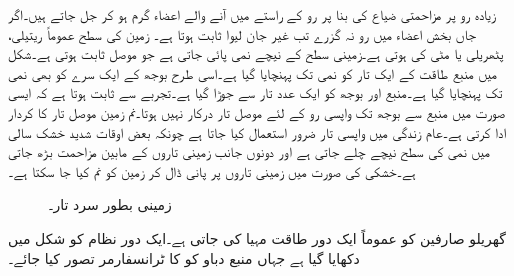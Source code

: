 زیادہ رو  پر مزاحمتی ضیاع کی بنا پر رو کے راستے میں آنے والے اعضاء گرم ہو کر جل جاتے ہیں۔اگر جاں بخش اعضاء میں رو نہ گزرے تب غیر جان لیوا ثابت ہوتا ہے۔  
زمین کی سطح عموماً ریتیلی، پٹھریلی یا مٹی کی ہوتی ہے۔زمینی سطح کے نیچے نمی پائی جاتی ہے جو موصل ثابت ہوتی ہے۔شکل  میں منبع طاقت کے ایک تار کو نمی تک پہنچایا گیا ہے۔اسی طرح بوجھ کے ایک سرے کو بھی نمی تک پہنچایا گیا ہے۔منبع اور بوجھ کو ایک عدد تار سے جوڑا گیا ہے۔تجربے سے ثابت ہوتا ہے کہ ایسی صورت میں منبع سے بوجھ تک واپسی رو کے لئے موصل تار درکار نہیں ہوتا۔نم زمین موصل تار کا کردار ادا کرتی ہے۔عام زندگی میں واپسی تار ضرور استعمال کیا جاتا ہے چونکہ بعض اوقات شدید خشک سالی میں نمی کی سطح نیچے چلے جاتی ہے اور دونوں جانب زمینی تاروں کے مابین مزاحمت بڑھ جاتی ہے۔خشکی کی صورت میں زمینی تاروں پر پانی ڈال کر زمین کو نم کیا جا سکتا ہے۔
\begin{figure}
\centering
{}
\caption{زمینی بطور سرد تار۔}
\label{شکل_طاقت_زمین_سرد_تار}
\end{figure}
 
گھریلو صارفین کو عموماً ایک دور طاقت مہیا کی جاتی ہے۔ایک دور نظام کو شکل  میں دکھایا گیا ہے جہاں منبع دباو کو  کا ٹرانسفارمر تصور کیا جائے۔

